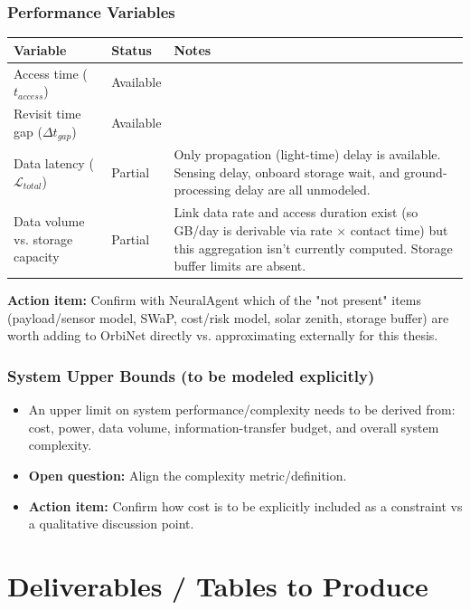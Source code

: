 \documentclass[11pt]{article}
\newcommand{\openquestion}[1]{\textcolor{openq}{\textbf{Open question:}} #1}
\newcommand{\actionitem}[1]{\textcolor{todo}{\textbf{Action item:}} #1}
\begin{document}
\subsubsection{Performance Variables}

\begin{longtable}{p{4cm}p{2.3cm}p{7.4cm}}
\toprule
\textbf{Variable} & \textbf{Status} & \textbf{Notes} \\
\midrule
\endhead
Access time ($t_{access}$) & Available & \\
Revisit time gap ($\Delta t_{gap}$) & Available & \\
Data latency ($\mathcal{L}_{total}$) & Partial & Only propagation (light-time) delay is available. Sensing delay, onboard storage wait, and ground-processing delay are all unmodeled. \\
Data volume vs. storage capacity & Partial & Link data rate and access duration exist (so GB/day is derivable via rate $\times$ contact time) but this aggregation isn't currently computed. Storage buffer limits are absent. \\
\bottomrule
\end{longtable}

\actionitem{Confirm with NeuralAgent which of the "not present" items (payload/sensor model, SWaP, cost/risk model, solar zenith, storage buffer) are worth adding to OrbiNet directly vs. approximating externally for this thesis.}

\subsubsection{System Upper Bounds (to be modeled explicitly)}
\begin{itemize}[leftmargin=1.2cm]
    \item An upper limit on system performance/complexity needs to be derived from: cost, power, data volume, information-transfer budget, and overall system complexity.
    \item \openquestion{Align the complexity metric/definition.}
    \item \actionitem{Confirm how cost is to be explicitly included as a constraint vs a qualitative discussion point.}
\end{itemize}

\section{Deliverables / Tables to Produce}
\end{document}
